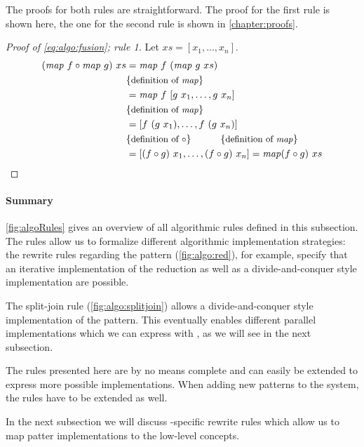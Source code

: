 The proofs for both rules are straightforward.
The proof for the first rule is shown here, the one for the second rule is shown in \autoref{chapter:proofs}.

\begin{proof}[Proof of \autoref{eq:algo:fusion}; rule 1]
  Let $xs = [x_1, \ldots, x_n]$.
  \begin{align*}
    (\text{\textit{map}}\ f\circ \text{\textit{map}}\ g)\ xs
      &= \text{\textit{map}}\ f\ (\text{\textit{map}}\ g\ xs)\\
      &\{\text{\small definition of \text{\textit{map}}}\}\\
      &= \text{\textit{map}}\ f\ [g\ x_1, \ldots, g\ x_n]\\
      &\{\text{\small definition of \text{\textit{map}}}\}\\
      &= [f\ (g\ x_1), \ldots, f\ (g\ x_n)]\\
      &\{\text{\small definition of $\circ$}\}\qquad\quad \{\text{\small definition of \text{\textit{map}}}\}\\
      &= [(f\circ g)\ x_1, \ldots, (f\circ g)\ x_n] = \text{\textit{map}} (f\circ g)\ xs
  \end{align*}
\end{proof}

\paragraph{Summary}
\autoref{fig:algoRules} gives an overview of all algorithmic rules defined in this subsection.
The rules allow us to formalize different algorithmic implementation strategies:
the rewrite rules regarding the \reduce pattern (\autoref{fig:algo:red}), for example, specify that an iterative implementation of the reduction as well as a divide-and-conquer style implementation are possible.

The split-join rule (\autoref{fig:algo:splitjoin}) allows a divide-and-conquer style implementation of the \map pattern.
This eventually enables different parallel implementations which we can express with \OpenCL, as we will see in the next subsection.

The rules presented here are by no means complete and can easily be extended to express more possible implementations.
When adding new patterns to the system, the rules have to be extended as well.

In the next subsection we will discuss \OpenCL-specific rewrite rules which allow us to map patter implementations to the low-level \OpenCL concepts.

